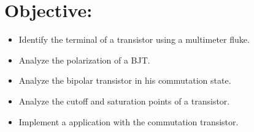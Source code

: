 \section{Objective:}

\begin{itemize}
\item Identify the terminal of a transistor using a multimeter fluke.
\item Analyze the polarization of a BJT.
\item Analyze the bipolar transistor in his commutation state.
\item Analyze the cutoff and saturation points of a transistor.
\item Implement a application with the commutation transistor.
\end{itemize}
\pagebreak